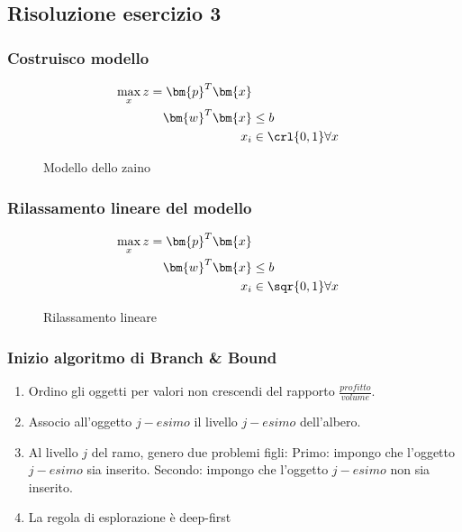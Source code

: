 \documentclass[\main/main.tex]{subfiles}
\begin{document}
\subsection{Risoluzione esercizio 3}

\subsubsection*{Costruisco modello}

\begin{figure}
  \begin{align*}
    \max_x z = \bm{p}^T \bm{x}                \\
    \bm{w}^T \bm{x} & \leq b                  \\
    x_i             & \in \crl{0,1} \forall x \\
  \end{align*}
  \caption{Modello dello zaino}
\end{figure}

\subsubsection*{Rilassamento lineare del modello}
\begin{figure}
  \begin{align*}
    \max_x z = \bm{p}^T \bm{x}                \\
    \bm{w}^T \bm{x} & \leq b                  \\
    x_i             & \in \sqr{0,1} \forall x \\
  \end{align*}
  \caption{Rilassamento lineare}
\end{figure}

\subsubsection*{Inizio algoritmo di Branch \& Bound}

\begin{enumerate}
  \item Ordino gli oggetti per valori non crescendi del rapporto $\frac{profitto}{volume}$.
  \item Associo all'oggetto $j-esimo$ il livello $j-esimo$ dell'albero.
  \item Al livello $j$ del ramo, genero due problemi figli:
        \subitem Primo: impongo che l'oggetto $j-esimo$ sia inserito.
        \subitem Secondo: impongo che l'oggetto $j-esimo$ non sia inserito.
  \item La regola di esplorazione è deep-first
\end{enumerate}
\end{document}
